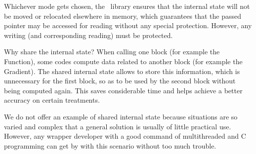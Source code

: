 Whichever mode gets chosen, the \OT\ library ensures that the internal state will not be moved or relocated elsewhere in memory, which guarantees that the passed pointer may be accessed for reading without any special protection. However, any writing (and corresponding reading) must be protected.

Why share the internal state? When calling one block (for example the Function), some codes compute data related to another block (for example the Gradient). The shared internal state allows to store this information, which is unnecessary for the first block, so as to be used by the second block without being computed again. This saves considerable time and helps achieve a better accuracy on certain treatments.

We do not offer an example of shared internal state because situations are so varied and complex that a general solution is usually of little practical use. However, any wrapper developer with a good command of multithreaded and C programming can get by with this scenario without too much trouble.
